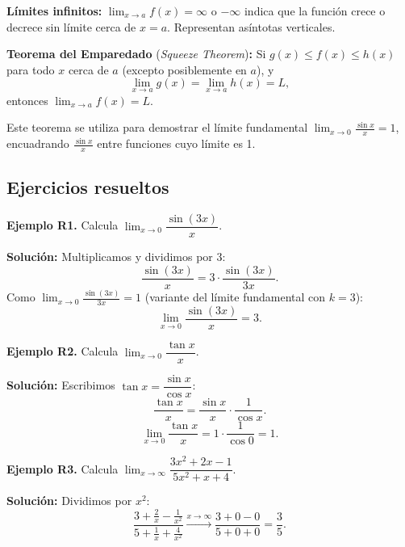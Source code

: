 \documentclass[12pt, letterpaper]{article}
\begin{document}
\begin{cuadroadvertencia}
  \textbf{Límites infinitos:} $\lim_{x \to a} f(x) = \infty$ o $-\infty$ indica que la función crece o decrece sin límite cerca de $x = a$. Representan asíntotas verticales.
\end{cuadroadvertencia}

\begin{cuadroextra}
  \textbf{Teorema del Emparedado} (\textit{Squeeze Theorem})\textbf{:} Si $g(x) \leq f(x) \leq h(x)$ para todo $x$ cerca de $a$ (excepto posiblemente en $a$), y
  $$\lim_{x \to a} g(x) = \lim_{x \to a} h(x) = L,$$
  entonces $\lim_{x \to a} f(x) = L$.

  Este teorema se utiliza para demostrar el límite fundamental $\lim_{x \to 0} \frac{\sin x}{x} = 1$, encuadrando $\frac{\sin x}{x}$ entre funciones cuyo límite es 1.
\end{cuadroextra}

\subsection{Ejercicios resueltos}

\textbf{Ejemplo R1.} Calcula $\lim_{x \to 0} \dfrac{\sin(3x)}{x}$.

\begin{cuadrosolucion}
  \textbf{Solución:} Multiplicamos y dividimos por 3:
  $$\frac{\sin(3x)}{x} = 3 \cdot \frac{\sin(3x)}{3x}.$$
  Como $\lim_{x \to 0} \frac{\sin(3x)}{3x} = 1$ (variante del límite fundamental con $k = 3$):
  $$\lim_{x \to 0} \frac{\sin(3x)}{x} = 3.$$
\end{cuadrosolucion}

\textbf{Ejemplo R2.} Calcula $\lim_{x \to 0} \dfrac{\tan x}{x}$.

\begin{cuadrosolucion}
  \textbf{Solución:} Escribimos $\tan x = \dfrac{\sin x}{\cos x}$:
  $$\frac{\tan x}{x} = \frac{\sin x}{x} \cdot \frac{1}{\cos x}.$$
  $$\lim_{x \to 0} \frac{\tan x}{x} = 1 \cdot \frac{1}{\cos 0} = 1.$$
\end{cuadrosolucion}

\textbf{Ejemplo R3.} Calcula $\lim_{x \to \infty} \dfrac{3x^2 + 2x - 1}{5x^2 + x + 4}$.

\begin{cuadrosolucion}
  \textbf{Solución:} Dividimos por $x^2$:
  $$\frac{3 + \frac{2}{x} - \frac{1}{x^2}}{5 + \frac{1}{x} + \frac{4}{x^2}} \xrightarrow{x \to \infty} \frac{3 + 0 - 0}{5 + 0 + 0} = \frac{3}{5}.$$
\end{cuadrosolucion}
\end{document}
